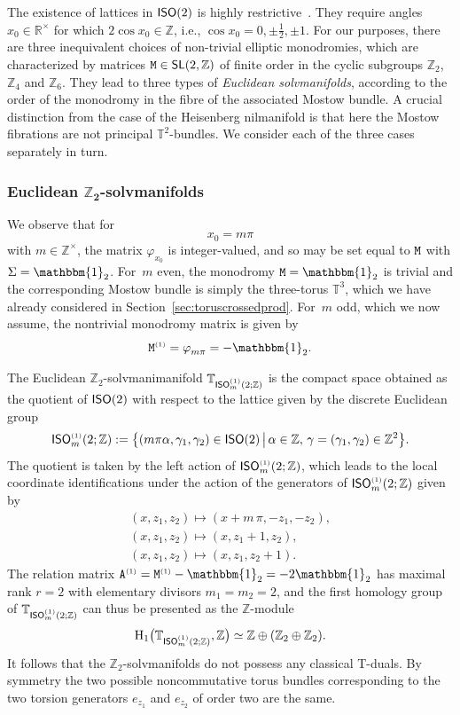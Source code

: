 \documentclass[10pt,a4paper]{amsart}
\numberwithin{equation}{section}
\newcommand{\Z}{\zed}
\newcommand{\unit}{\mathbbm{1}} 			%
\newcommand{\sfSL}{\mathsf{SL}}
\newcommand{\rmH}{{\rm H}}
\newcommand{\ISO}{{\sf ISO}}
\newcommand{\R}{\real}
\newcommand{\zed}{{\mathbb Z}} %
\newcommand{\real}{{\mathbb R}} %
\newcommand{\torus}{{\mathbb T}} %
\begin{document}
The existence of lattices in $\ISO(2)$ is highly
restrictive~\cite{Hull2005,Hull2019}. They require angles
$x_0\in\R^\times$ for which $2\cos x_0\in\Z$, i.e., $\cos
x_0=0,\pm\frac12,\pm1$. For our purposes, there are three
inequivalent choices of non-trivial elliptic monodromies,
which are characterized by matrices ${\tt M}\in\sfSL(2,\Z)$ of finite
order in the cyclic subgroups $\Z_2$, $\Z_4$ and $\Z_6$. They lead to three
types of \emph{Euclidean solvmanifolds}, according to the order of the monodromy in the fibre of the
associated Mostow bundle. A crucial distinction from the case of the
Heisenberg nilmanifold is that here the Mostow fibrations are not
principal $\torus^2$-bundles.
We consider each of the three cases
separately in turn.

\subsubsection*{Euclidean $\boldsymbol{\Z_2}$-solvmanifolds}

We observe that for
\[
x_0 = m \pi
\]
with $m\in\Z^\times$, the matrix $\varphi_{x_0}$ is integer-valued, and so
may be set equal to $\tt M$ with $\Sigma=\unit_2$. For~$m$ even, the
monodromy ${\tt M}=\unit_2$ is trivial and the corresponding
Mostow bundle is simply the three-torus $\torus^3$, which we have
already considered in Section~\ref{sec:toruscrossedprod}. For~$m$ odd,
which we now assume,
the nontrivial monodromy matrix is given by
\begin{gather}\label{eq:mon1}
{\tt M}^{\text{\tiny(1)}} = \varphi^{\phantom{\dag}}_{m \pi} = -\unit_2 .
\end{gather}

The Euclidean
$\Z_2$-solvmanimanifold $\torus_{\ISO_m ^{\text{\tiny(1)}} (2;\Z)}$ is the compact
space obtained as the quotient of $\ISO(2)$ with
respect to the lattice given by the discrete Euclidean group
\[
\ISO ^{\text{\tiny(1)}}_m(2;\Z) := \big\{ (m \pi \alpha,\gamma_1,\gamma_2)\in\ISO(2) \,
\big| \, \alpha\in\Z , \, \gamma=(\gamma_1,\gamma_2)\in\Z^2 \big\} .
\]
The quotient is taken by the left action of
$\ISO ^{\text{\tiny(1)}}_m(2;\Z)$, which leads
to the local coordinate identifications under the action of the
generators of $\ISO ^{\text{\tiny(1)}}_m(2;\Z)$ given by
\begin{gather*}
(x,z_1,z_2) \longmapsto (x+m\,\pi,-z_1,-z_2) , \nonumber \\
(x,z_1,z_2) \longmapsto (x,z_1+1,z_2) , \nonumber \\
(x,z_1,z_2) \longmapsto (x,z_1,z_2+1) .%
\end{gather*}
The relation matrix $
{\tt A}^{\text{\tiny(1)}} = {\tt M}^{\text{\tiny(1)}}-\unit_2 = -2\unit_2$ has maximal rank $r=2$ with elementary divisors
$m_1=m_2=2$, and
the first homology group of
$\torus_{\ISO ^{\text{\tiny(1)}}_m(2;\Z)}$ can thus be presented as the $\Z$-module
\[
\rmH_1\big(\torus_{\ISO ^{\text{\tiny(1)}}_m(2;\Z)},\Z\big) \simeq
\Z\oplus(\Z_2\oplus\Z_2) .
\]
It follows that the $\Z_2$-solvmanifolds do not possess any classical
T-duals. By symmetry the two possible noncommutative torus bundles
corresponding to the two torsion generators $e_{z_1}$ and $e_{z_2}$ of
order two are the same.
\end{document}
